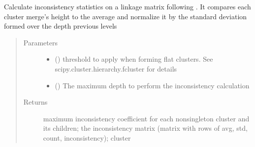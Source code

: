 \documentclass[letterpaper,10pt,english]{sphinxmanual}
\begin{document}
\begin{fulllineitems}
\begin{fulllineitems}
\label{\detokenize{modules/dtw_analysis:dtwhaclustering.dtw_analysis.dtw_clustering.compute_cut_off_inconsistency}}
\sphinxAtStartPar
Calculate inconsistency statistics on a linkage matrix following . It compares each cluster merge’s height  to the average  and normalize it by the standard deviation  formed over the depth previous levels
\begin{quote}\begin{description}
\item[{Parameters}] \leavevmode\begin{itemize}
\item {} 
\sphinxAtStartPar
{} () \textendash{} threshold to apply when forming flat clusters. See scipy.cluster.hierarchy.fcluster for details

\item {} 
\sphinxAtStartPar
{} () \textendash{} The maximum depth to perform the inconsistency calculation

\end{itemize}

\item[{Returns}] \leavevmode
\sphinxAtStartPar
maximum inconsistency coefficient for each non\sphinxhyphen{}singleton cluster and its children; the inconsistency matrix (matrix with rows of avg, std, count, inconsistency); cluster

\end{description}\end{quote}

\end{fulllineitems}



\end{fulllineitems}
\end{document}
